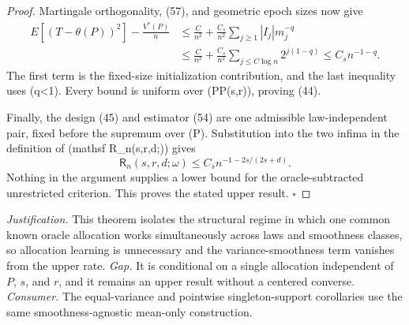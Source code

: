 \documentclass{article}
\begin{document}
\begin{proof}
Martingale orthogonality, (57), and geometric epoch sizes now give
\[
\begin{aligned}
E[(T-\theta(P))^2]-\frac{V^*(P)}n
&\leq\frac{C}{n^2}
+\frac{C_s}{n^2}\sum_{j\geq1}|I_j|m_j^{-q}\\
&\leq\frac{C}{n^2}
+\frac{C_s}{n^2}\sum_{j\leq C\log n}2^{j(1-q)}
\leq C_s n^{-1-q}.
\tag{58}
\end{aligned}
\]
The first term is the fixed-size initialization contribution, and the last inequality uses (q<1).  Every bound is uniform over (P\in\mathcal P(s,r)), proving (44).

Finally, the design (45) and estimator (54) are one admissible law-independent pair, fixed before the supremum over (P).  Substitution into the two infima in the definition of (mathsf R\_n(s,r,d;\omega)) gives
\[
\mathsf R_n(s,r,d;\omega)\leq C_s n^{-1-2s/(2s+d)}.
\]
Nothing in the argument supplies a lower bound for the oracle-subtracted unrestricted criterion.  This proves the stated upper result. \(\square\)
\end{proof}
\par\smallskip\noindent \textit{Justification.} This theorem isolates the structural regime in which one common known oracle allocation works simultaneously across laws and smoothness classes, so allocation learning is unnecessary and the variance-smoothness term vanishes from the upper rate. \textit{Gap.} It is conditional on a single allocation independent of \(P\), \(s\), and \(r\), and it remains an upper result without a centered converse. \textit{Consumer.} The equal-variance and pointwise singleton-support corollaries use the same smoothness-agnostic mean-only construction.
\end{document}
